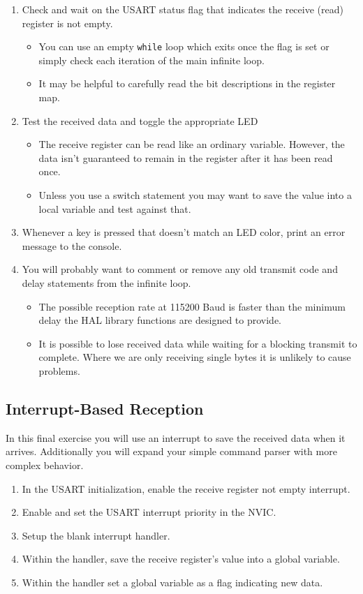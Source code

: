 \documentclass[11pt,fleqn]{book} %
\begin{document}
\begin{enumerate}
    \item Check and wait on the USART status flag that indicates the receive (read) register is not empty.
    \begin{itemize}
        \item You can use an empty \texttt{while} loop which exits once the flag is set or simply check each iteration of the main infinite loop. 
        \item It may be helpful to carefully read the bit descriptions in the register map.
    \end{itemize}
    \item Test the received data and toggle the appropriate LED
    \begin{itemize}
        \item The receive register can be read like an ordinary variable. However, the data isn't guaranteed to remain in the register after it has been read once. 
        \item Unless you use a switch statement you may want to save the value into a local variable and test against that. 
    \end{itemize}
    \item Whenever a key is pressed that doesn't match an LED color, print an error message to the console. 
    \item You will probably want to comment or remove any old transmit code and delay statements from the infinite loop. 
    \begin{itemize}
        \item The possible reception rate at 115200 Baud is faster than the minimum delay the HAL library functions are designed to provide. 
        \item It is possible to lose received data while waiting for a blocking transmit to complete. Where we are only receiving single bytes it is unlikely to cause problems.
    \end{itemize}
\end{enumerate}


\subsection{Interrupt-Based Reception}
In this final exercise you will use an interrupt to save the received data when it arrives. Additionally you will expand your simple command parser with more complex behavior.

\begin{enumerate}
    \item In the USART initialization, enable the receive register not empty interrupt.
    \item Enable and set the USART interrupt priority in the NVIC.
    \item Setup the blank interrupt handler.
    \item Within the handler, save the receive register's value into a global variable.
    \item Within the handler set a global variable as a flag indicating new data. 
\end{enumerate} 
\end{document}
